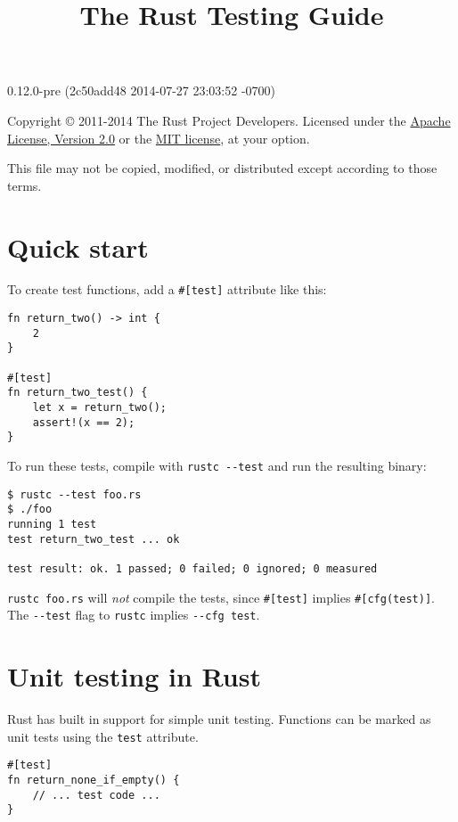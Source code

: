 \documentclass[]{article}
\title{The Rust Testing Guide}
\begin{document}
\maketitle

0.12.0-pre (2c50add48 2014-07-27 23:03:52 -0700)

Copyright © 2011-2014 The Rust Project Developers. Licensed under the
\href{http://www.apache.org/licenses/LICENSE-2.0}{Apache License,
Version 2.0} or the \href{http://opensource.org/licenses/MIT}{MIT
license}, at your option.

This file may not be copied, modified, or distributed except according
to those terms.

{
\hypersetup{linkcolor=black}
\setcounter{tocdepth}{3}
\tableofcontents
}
\section{Quick start}\label{quick-start}

To create test functions, add a \texttt{\#{[}test{]}} attribute like
this:

\begin{verbatim}
fn return_two() -> int {
    2
}

#[test]
fn return_two_test() {
    let x = return_two();
    assert!(x == 2);
}
\end{verbatim}

To run these tests, compile with \texttt{rustc -\/-test} and run the
resulting binary:

\begin{verbatim}
$ rustc --test foo.rs
$ ./foo
running 1 test
test return_two_test ... ok

test result: ok. 1 passed; 0 failed; 0 ignored; 0 measured
\end{verbatim}

\texttt{rustc foo.rs} will \emph{not} compile the tests, since
\texttt{\#{[}test{]}} implies \texttt{\#{[}cfg(test){]}}. The
\texttt{-\/-test} flag to \texttt{rustc} implies \texttt{-\/-cfg test}.

\section{Unit testing in Rust}\label{unit-testing-in-rust}

Rust has built in support for simple unit testing. Functions can be
marked as unit tests using the \texttt{test} attribute.

\begin{verbatim}
#[test]
fn return_none_if_empty() {
    // ... test code ...
}
\end{verbatim}
\end{document}
